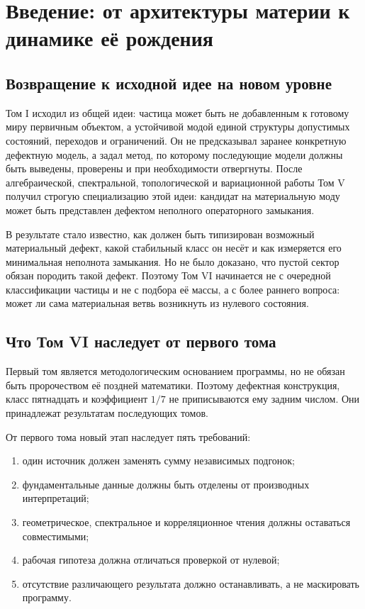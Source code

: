 \chapter{Введение: от архитектуры материи к динамике её рождения}

\section{Возвращение к исходной идее на новом уровне}

Том I исходил из общей идеи: частица может быть не добавленным к готовому
миру первичным объектом, а устойчивой модой единой структуры допустимых
состояний, переходов и ограничений. Он не предсказывал заранее конкретную
дефектную модель, а задал метод, по которому последующие модели должны
быть выведены, проверены и при необходимости отвергнуты. После
алгебраической, спектральной, топологической и вариационной работы Том V
получил строгую специализацию этой идеи: кандидат на материальную моду
может быть представлен дефектом неполного операторного замыкания.

В результате стало известно, как должен быть типизирован возможный
материальный дефект, какой стабильный класс он несёт и как измеряется его
минимальная неполнота замыкания. Но не было доказано, что пустой сектор
обязан породить такой дефект. Поэтому Том VI начинается не с очередной
классификации частицы и не с подбора её массы, а с более раннего вопроса:
может ли сама материальная ветвь возникнуть из нулевого состояния.

\section{Что Том VI наследует от первого тома}

Первый том является методологическим основанием программы, но не обязан
быть пророчеством её поздней математики. Поэтому дефектная конструкция,
класс пятнадцать и коэффициент $1/7$ не приписываются ему задним числом.
Они принадлежат результатам последующих томов.

От первого тома новый этап наследует пять требований:
\begin{enumerate}
 \item один источник должен заменять сумму независимых подгонок;
 \item фундаментальные данные должны быть отделены от производных
 интерпретаций;
 \item геометрическое, спектральное и корреляционное чтения должны
 оставаться совместимыми;
 \item рабочая гипотеза должна отличаться проверкой от нулевой;
 \item отсутствие различающего результата должно останавливать, а не
 маскировать программу.
\end{enumerate}

